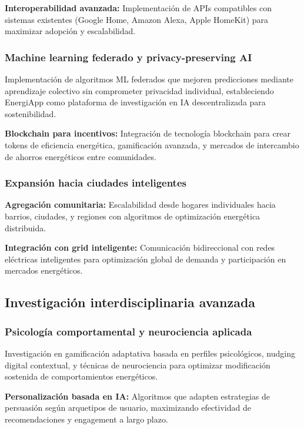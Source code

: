 \textbf{Interoperabilidad avanzada:} Implementación de APIs compatibles con sistemas existentes (Google Home, Amazon Alexa, Apple HomeKit) para maximizar adopción y escalabilidad.

\subsubsection{Machine learning federado y privacy-preserving AI}

Implementación de algoritmos ML federados que mejoren predicciones mediante aprendizaje colectivo sin comprometer privacidad individual, estableciendo EnergiApp como plataforma de investigación en IA descentralizada para sostenibilidad.

\textbf{Blockchain para incentivos:} Integración de tecnología blockchain para crear tokens de eficiencia energética, gamificación avanzada, y mercados de intercambio de ahorros energéticos entre comunidades.

\subsubsection{Expansión hacia ciudades inteligentes}

\textbf{Agregación comunitaria:} Escalabilidad desde hogares individuales hacia barrios, ciudades, y regiones con algoritmos de optimización energética distribuida.

\textbf{Integración con grid inteligente:} Comunicación bidireccional con redes eléctricas inteligentes para optimización global de demanda y participación en mercados energéticos.

\subsection{Investigación interdisciplinaria avanzada}

\subsubsection{Psicología comportamental y neurociencia aplicada}

Investigación en gamificación adaptativa basada en perfiles psicológicos, nudging digital contextual, y técnicas de neurociencia para optimizar modificación sostenida de comportamientos energéticos.

\textbf{Personalización basada en IA:} Algoritmos que adapten estrategias de persuasión según arquetipos de usuario, maximizando efectividad de recomendaciones y engagement a largo plazo.

